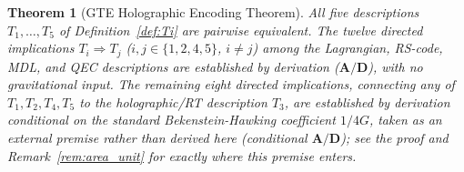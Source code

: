 \documentclass[11pt]{article}
\newtheorem{theorem}{Theorem}[section]
\theoremstyle{remark}
\newcommand{\CatAD}{\textbf{A/D}}
\begin{document}
\begin{theorem}[GTE Holographic Encoding Theorem]
\label{thm:ghet}
All five descriptions $T_1,\ldots,T_5$ of Definition~\ref{def:Ti} are pairwise
equivalent.  The twelve directed implications $T_i\Rightarrow T_j$
($i,j\in\{1,2,4,5\}$, $i\neq j$) among the Lagrangian, RS-code, MDL, and QEC
descriptions are established by derivation ($\CatAD$), with no gravitational
input.  The remaining eight directed implications, connecting any of
$T_1,T_2,T_4,T_5$ to the holographic/RT description $T_3$, are established
by derivation \emph{conditional} on the standard Bekenstein-Hawking coefficient
$1/4G$, taken as an external premise rather than derived here (conditional
$\CatAD$); see the proof and Remark~\ref{rem:area_unit} for exactly where this
premise enters.
\end{theorem}
\end{document}
